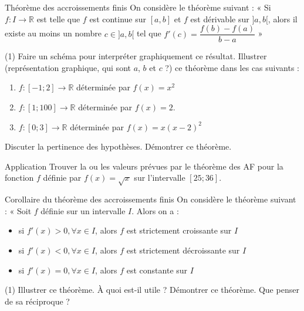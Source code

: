 \documentclass[a4paper,12pt]{article}
\begin{document}
\begin{activite}{Théorème des accroissements finis}
\tcblower
On considère le théorème suivant : « Si $f: I \to \mathbb{R}$ est telle que $f$ est continue sur $[a,b]$ et $f$ est dérivable sur $]a,b[$, alors il existe au moins un nombre $c \in ]a,b[$ tel que $f'(c) = \dfrac{f(b) - f(a)}{b - a}$ »

\begin{tasks}(1)
\task Faire un schéma pour interpréter graphiquement ce résultat.
\task Illustrer (représentation graphique, qui sont $a$, $b$ et $c$ ?) ce théorème dans les cas suivants :
\begin{enumerate}
\item $f:[-1;2] \to \mathbb{R}$ déterminée par $f(x) = x^2$
\item $f:[1;100] \to \mathbb{R}$ déterminée par $f(x) = 2$.
\item $f:[0;3] \to \mathbb{R}$ déterminée par $f(x) = x(x-2)^2$
\end{enumerate}
\task Discuter la pertinence des hypothèses.
\task Démontrer ce théorème.
\end{tasks}
\end{activite}
\begin{activite}{Application}
\tcblower
Trouver la ou les valeurs prévues par le théorème des AF pour la fonction $f$ définie par $f(x) = \sqrt{x}$ sur l'intervalle $[25;36]$.
\end{activite}
\begin{activite}{Corollaire du théorème des accroissements finis}
\tcblower
On considère le théorème suivant : « Soit $f$ définie sur un intervalle $I$. Alors on a :
\begin{itemize}
	\item si $f'(x) > 0, \forall x \in I$, alors $f$ est strictement croissante sur $I$
\item si $f'(x) < 0, \forall x \in I$, alors $f$ est strictement décroissante sur $I$
\item si $f'(x) = 0, \forall x \in I$, alors $f$ est constante sur $I$
\end{itemize}
\begin{tasks}(1)
\task Illustrer ce théorème.
\task À quoi est-il utile ?
\task Démontrer ce théorème.
\task Que penser de sa réciproque ?
\end{tasks}
\end{activite}
\end{document}
